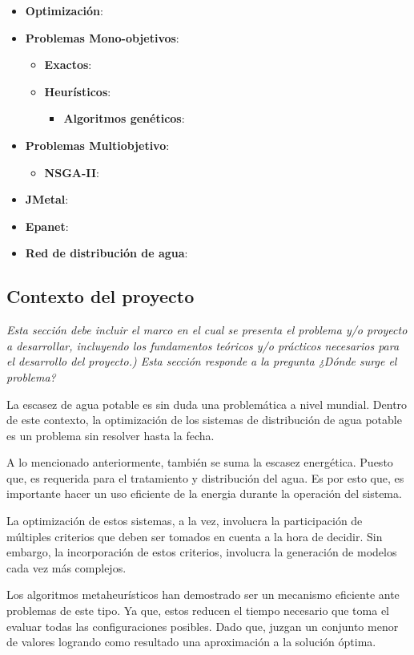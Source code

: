 \documentclass[11pt,letterpaper]{article}
\begin{document}
\begin{itemize}
\item \textbf{Optimización}: 
\item \textbf{Problemas Mono-objetivos}: 
\begin{itemize}
	\item \textbf{Exactos}: 
	\item \textbf{Heurísticos}: 
	\begin{itemize}
		\item \textbf{Algoritmos genéticos}: 
	\end{itemize}
\end{itemize}
\item \textbf{Problemas Multiobjetivo}:
	\begin{itemize}
		\item \textbf{NSGA-II}: 
	\end{itemize}
\item \textbf{JMetal}:
\item \textbf{Epanet}:
\item \textbf{Red de distribución de agua}:
 
\end{itemize}

\subsection{Contexto del proyecto} 
\emph{Esta sección debe incluir el marco en el cual se presenta el problema y/o proyecto a desarrollar, incluyendo los fundamentos teóricos y/o prácticos necesarios para el desarrollo del proyecto.) Esta sección responde a la pregunta ¿Dónde surge el problema?}

La escasez de agua potable es sin duda una problemática a nivel mundial. Dentro de este contexto, la optimización de los sistemas de distribución de agua potable es un problema sin resolver hasta la fecha. 

A lo mencionado anteriormente, también se suma la escasez energética. Puesto que, es requerida para el tratamiento y distribución del agua. Es por esto que, es importante hacer un uso eficiente de la energia durante la operación del sistema.

La optimización de estos sistemas, a la vez, involucra la participación de múltiples criterios que deben ser tomados en cuenta a la hora de decidir. Sin embargo, la incorporación de estos criterios, involucra la generación de modelos cada vez más complejos.

Los algoritmos metaheurísticos han demostrado ser un mecanismo eficiente ante problemas de este tipo. Ya que, estos reducen el tiempo necesario que toma el evaluar todas las configuraciones posibles. Dado que, juzgan un conjunto menor de valores logrando como resultado una aproximación a la solución óptima.
\end{document}

